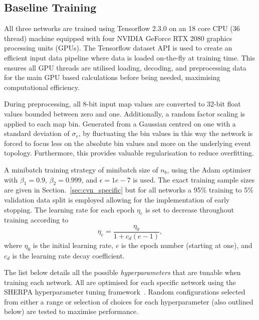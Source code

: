\subsection{Baseline Training} %
\label{sec:cvn_baseline_training} %

All three networks are trained using Tensorflow 2.3.0 on an 18 core CPU (36 thread) machine
equipped with four NVIDIA GeForce RTX 2080 graphics processing units (GPUs). The Tensorflow
dataset API is used to create an efficient input data pipeline where data is loaded on-the-fly at
training time. This ensures all GPU threads are utilised loading, decoding, and preprocessing data
for the main GPU based calculations before being needed, maximising computational efficiency.

During preprocessing, all 8-bit input map values are converted to 32-bit float values bounded
between zero and one. Additionally, a random factor scaling is applied to each map bin. Generated
from a Gaussian centred on one with a standard deviation of $\sigma_{r}$, by fluctuating the bin
values in this way the network is forced to focus less on the absolute bin values and more on the
underlying event topology. Furthermore, this provides valuable regularisation to reduce
overfitting.

A minibatch training strategy of minibatch size of $n_{b}$, using the Adam
optimiser~\cite{kingma2014} with $\beta_{1}=0.9$, $\beta_{2}=0.999$, and $\epsilon = 1e-7$ is
used. The exact training sample sizes are given in Section.~\ref{sec:cvn_specific} but for all
networks a 95\% training to 5\% validation data split is employed allowing for the implementation
of early stopping. The learning rate for each epoch $\eta_{e}$ is set to decrease throughout
training according to
\begin{equation}
    \eta_{e}=\frac{\eta_{0}}{1+c_{d}(e-1)},
\end{equation}
where $\eta_{0}$ is the initial learning rate, $e$ is the epoch number (starting at one), and
$c_{d}$ is the learning rate decay coefficient.

The list below details all the possible \emph{hyperparameters} that are tunable when training each
network. All are optimised for each specific network using the SHERPA hyperparameter tuning
framework~\cite{hertel2020}. Random configurations selected from either a range or selection of
choices for each hyperparameter (also outlined below) are tested to maximise performance.


